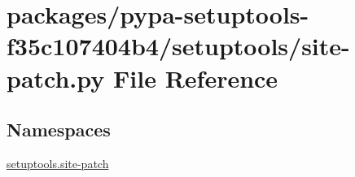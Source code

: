 \hypertarget{site-patch_8py}{}\section{packages/pypa-\/setuptools-\/f35c107404b4/setuptools/site-\/patch.py File Reference}
\label{site-patch_8py}
\subsection*{Namespaces}
\begin{DoxyCompactItemize}
\item 
 \hyperlink{namespacesetuptools_1_1site-patch}{setuptools.\+site-\/patch}
\end{DoxyCompactItemize}
